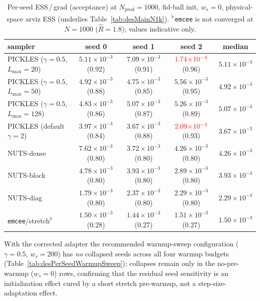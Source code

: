 \documentclass{article}
\begin{document}
\begin{table}[h]
\centering
\caption{Per-seed ESS\,/\,grad (acceptance) at $N_{\text{prod}}=1000$,
fid-ball init, $w_s=0$, physical-space arviz ESS (underlies
Table~\ref{tab:desMainN1k}). \textsuperscript{$\flat$}\,\texttt{emcee}
is not converged at $N{=}1000$ ($\hat R=1.8$); values indicative only.}
\label{tab:desPerSeedMainN1k}
\small
\setlength{\tabcolsep}{4pt}
\begin{tabular}{l c c c c}
\toprule
sampler & seed 0 & seed 1 & seed 2 & median \\
\midrule
PICKLES ($\gamma{=}0.5$, $L_{\max}{=}20$) & $5.11\!\times\!10^{-3}$ (0.92) & $7.09\!\times\!10^{-3}$ (0.91) & $\textcolor{red}{1.74\!\times\!10^{-4}}$ (0.96) & $5.11\!\times\!10^{-3}$ \\
PICKLES ($\gamma{=}0.5$, $L_{\max}{=}50$) & $4.92\!\times\!10^{-3}$ (0.88) & $4.75\!\times\!10^{-3}$ (0.85) & $5.56\!\times\!10^{-3}$ (0.95) & $4.92\!\times\!10^{-3}$ \\
PICKLES ($\gamma{=}0.5$, $L_{\max}{=}128$) & $4.83\!\times\!10^{-3}$ (0.86) & $5.07\!\times\!10^{-3}$ (0.87) & $5.26\!\times\!10^{-3}$ (0.89) & $5.07\!\times\!10^{-3}$ \\
PICKLES (default $\gamma{=}2$) & $3.97\!\times\!10^{-3}$ (0.84) & $3.67\!\times\!10^{-3}$ (0.88) & $\textcolor{red}{2.09\!\times\!10^{-4}}$ (0.93) & $3.67\!\times\!10^{-3}$ \\
\midrule
NUTS-dense & $7.62\!\times\!10^{-3}$ (0.80) & $3.72\!\times\!10^{-3}$ (0.80) & $4.26\!\times\!10^{-3}$ (0.80) & $4.26\!\times\!10^{-3}$ \\
NUTS-block & $4.78\!\times\!10^{-3}$ (0.80) & $3.93\!\times\!10^{-3}$ (0.80) & $2.89\!\times\!10^{-3}$ (0.80) & $3.93\!\times\!10^{-3}$ \\
NUTS-diag & $1.79\!\times\!10^{-3}$ (0.80) & $2.37\!\times\!10^{-3}$ (0.80) & $2.29\!\times\!10^{-3}$ (0.80) & $2.29\!\times\!10^{-3}$ \\
\texttt{emcee}/stretch\textsuperscript{$\flat$} & $1.50\!\times\!10^{-3}$ (0.28) & $1.44\!\times\!10^{-3}$ (0.27) & $1.51\!\times\!10^{-3}$ (0.27) & $1.50\!\times\!10^{-3}$ \\
\bottomrule
\end{tabular}
\end{table}

With the corrected adapter the recommended warmup-sweep configuration
($\gamma=0.5$, $w_s=200$) has \emph{no} collapsed seeds across all four
warmup budgets (Table~\ref{tab:desPerSeedWarmupSweep}); collapses remain
only in the no-pre-warmup ($w_s=0$) rows, confirming that the residual
seed sensitivity is an initialization effect cured by a short stretch
pre-warmup, not a step-size-adaptation effect.
\end{document}
